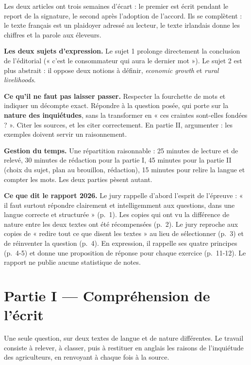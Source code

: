 \documentclass[11pt,a4paper]{article}
\begin{document}
Les deux articles ont trois semaines d'écart : le premier est écrit pendant le report de la signature, le second après l'adoption de l'accord. Ils se complètent : le texte français est un plaidoyer adressé au lecteur, le texte irlandais donne les chiffres et la parole aux éleveurs.

\textbf{Les deux sujets d'expression.} Le sujet 1 prolonge directement la conclusion de l'éditorial (« c'est le consommateur qui aura le dernier mot »). Le sujet 2 est plus abstrait : il oppose deux notions à définir, \emph{economic growth} et \emph{rural livelihoods}.

\textbf{Ce qu'il ne faut pas laisser passer.} Respecter la fourchette de mots et indiquer un décompte exact. Répondre à la question posée, qui porte sur la \textbf{nature des inquiétudes}, sans la transformer en « ces craintes sont-elles fondées ? ». Citer les sources, et les citer correctement. En partie II, argumenter : les exemples doivent servir un raisonnement.

\textbf{Gestion du temps.} Une répartition raisonnable : 25 minutes de lecture et de relevé, 30 minutes de rédaction pour la partie I, 45 minutes pour la partie II (choix du sujet, plan au brouillon, rédaction), 15 minutes pour relire la langue et compter les mots. Les deux parties pèsent autant.

\textbf{Ce que dit le rapport 2026.} Le jury rappelle d'abord l'esprit de l'épreuve : « il faut surtout répondre clairement et intelligemment aux questions, dans une langue correcte et structurée » (p.~1). Les copies qui ont vu la différence de nature entre les deux textes ont été récompensées (p.~2). Le jury reproche aux copies de « redire tout ce que disent les textes » au lieu de sélectionner (p.~3) et de réinventer la question (p.~4). En expression, il rappelle ses quatre principes (p.~4-5) et donne une proposition de réponse pour chaque exercice (p.~11-12). Le rapport ne publie aucune statistique de notes.

\hypertarget{partie-i-compruxe9hension-de-luxe9crit}{%
\section{Partie I --- Compréhension de l'écrit}\label{partie-i-compruxe9hension-de-luxe9crit}}

Une seule question, sur deux textes de langue et de nature différentes. Le travail consiste à relever, à classer, puis à restituer en anglais les raisons de l'inquiétude des agriculteurs, en renvoyant à chaque fois à la source.
\end{document}
